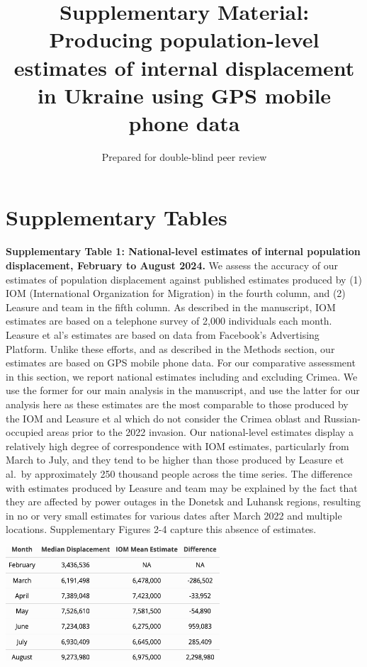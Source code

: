 \documentclass[
  11pt,
]{article}
\title{\textbf{Supplementary Material: Producing population-level
estimates of internal displacement in Ukraine using GPS mobile phone
data}}
\author{Prepared for double-blind peer review}
\date{}
\begin{document}
\maketitle

\newpage

\section{Supplementary Tables}\label{supplementary-tables}

\textbf{Supplementary Table 1: National-level estimates of internal
population displacement, February to August 2024.} We assess the
accuracy of our estimates of population displacement against published
estimates produced by (1) IOM (International Organization for Migration)
in the fourth column, and (2) Leasure and team in the fifth column. As
described in the manuscript, IOM estimates are based on a telephone
survey of 2,000 individuals each month. Leasure et al's estimates are
based on data from Facebook's Advertising Platform. Unlike these
efforts, and as described in the Methods section, our estimates are
based on GPS mobile phone data. For our comparative assessment in this
section, we report national estimates including and excluding Crimea. We
use the former for our main analysis in the manuscript, and use the
latter for our analysis here as these estimates are the most comparable
to those produced by the IOM and Leasure et al which do not consider the
Crimea oblast and Russian-occupied areas prior to the 2022 invasion. Our
national-level estimates display a relatively high degree of
correspondence with IOM estimates, particularly from March to July, and
they tend to be higher than those produced by Leasure et al.~by
approximately 250 thousand people across the time series. The difference
with estimates produced by Leasure and team may be explained by the fact
that they are affected by power outages in the Donetsk and Luhansk
regions, resulting in no or very small estimates for various dates after
March 2022 and multiple locations. Supplementary Figures 2-4 capture
this absence of estimates.

\label{tab-national}
\begin{center}
\includegraphics[width=0.6\textwidth,height=\textheight]{../outputs/sm/tables/table_all_estimates.png}
\end{center}
\end{document}
